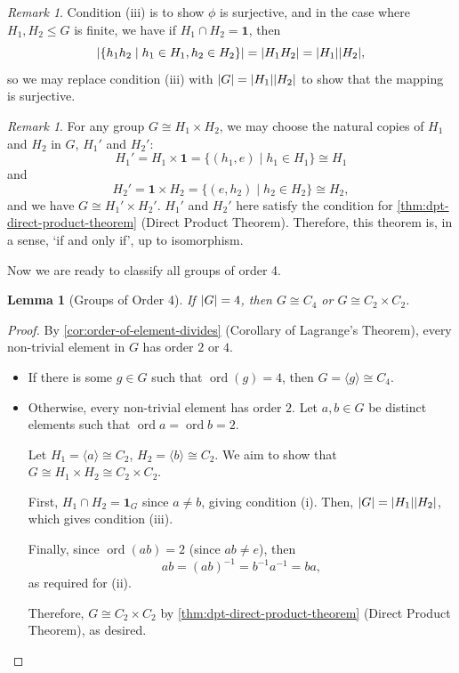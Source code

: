 \documentclass{article}
\newtheorem{lemma}[theorem]{Lemma}
\theoremstyle{definition}
\theoremstyle{remark}
\newtheorem{remark}[theorem]{Remark}
\DeclarePairedDelimiter{\abs}{\lvert}{\rvert}
\newcommand{\pqty}[1]{\left(#1\right)}
\newcommand{\angBrac}[1]{\langle #1\rangle}
\newcommand{\set}[2]{\{#1\mid #2\}}
\newcommand{\inverse}{^{-1}}
\newcommand{\isomorphic}{\cong}
\newcommand{\ord}{\operatorname{ord}}
\newcommand{\trivialgp}{\mathbf{1}}
\begin{document}
\begin{remark}
    Condition (iii) is to show \(\phi\) is surjective, and in the case where \(H_1, H_2 \leq G\) is finite, we have if \(H_1 \cap H_2 = \trivialgp\), then
    \[
        \abs{\set{h_1 h_2}{h_1 \in H_1, h_2 \in H_2}} = \abs{H_1 H_2} = \abs{H_1} \abs{H_2},
    \]
    so we may replace condition (iii) with \(\abs{G} = \abs{H_1} \abs{H_2}\) to show that the mapping is surjective.
\end{remark}

\begin{remark}
    For any group \(G \isomorphic H_1 \times H_2\), we may choose the natural copies of \(H_1\) and \(H_2\) in \(G\), \(H_1'\) and \(H_2'\):
    \[
        H_1' = H_1 \times \trivialgp = \set{\pqty{h_1, e}}{h_1 \in H_1} \isomorphic H_1
    \]
    and
    \[
        H_2' = \trivialgp \times H_2 = \set{\pqty{e, h_2}}{h_2 \in H_2} \isomorphic H_2,
    \]
    and we have \(G \isomorphic H_1' \times H_2'\). \(H_1'\) and \(H_2'\) here satisfy the condition for \autoref{thm:dpt-direct-product-theorem} (Direct Product Theorem). Therefore, this theorem is, in a sense, `if and only if', up to isomorphism.
\end{remark}

Now we are ready to classify all groups of order 4.

\begin{lemma}[Groups of Order 4]
    \label{lem:groups-of-order-4}%
    If \(\abs{G} = 4\), then \(G \isomorphic C_4\) or \(G \isomorphic C_2 \times C_2\).
\end{lemma}

\begin{proof}
    By \autoref{cor:order-of-element-divides} (Corollary of Lagrange's Theorem), every non-trivial element in \(G\) has order \(2\) or \(4\).
    
    \begin{itemize}
        \item If there is some \(g \in G\) such that \(\ord\pqty{g} = 4\), then \(G = \angBrac{g} \isomorphic C_4\).
        \item Otherwise, every non-trivial element has order \(2\). Let \(a, b \in G\) be distinct elements such that \(\ord{a} = \ord{b} = 2\).
        
        Let \(H_1 = \angBrac{a} \isomorphic C_2\), \(H_2 = \angBrac{b} \isomorphic C_2\). We aim to show that \(G \isomorphic H_1 \times H_2 \isomorphic C_2 \times C_2\).

        First, \(H_1 \cap H_2 = \trivialgp_{G}\) since \(a \neq b\), giving condition (i). Then, \(\abs{G} = \abs{H_1} \abs{H_2}\), which gives condition (iii).

        Finally, since \(\ord\pqty{ab} = 2\) (since \(ab \neq e\)), then
        \[
            ab = \pqty{ab}\inverse = b\inverse a\inverse = ba,
        \]
        as required for (ii).

        Therefore, \(G \isomorphic C_2 \times C_2\) by \autoref{thm:dpt-direct-product-theorem} (Direct Product Theorem), as desired.
    \end{itemize}
\end{proof}
\end{document}
